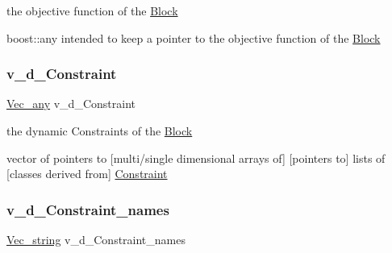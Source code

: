 the objective function of the \mbox{\hyperlink{class_s_m_spp__di__unipi__it_1_1_block}{Block}} 

boost\+::any intended to keep a pointer to the objective function of the \mbox{\hyperlink{class_s_m_spp__di__unipi__it_1_1_block}{Block}} \mbox{\label{class_s_m_spp__di__unipi__it_1_1_block_adbe2d40138adb5150da8553fdde5a88c}} 
\subsubsection{\texorpdfstring{v\+\_\+d\+\_\+\+Constraint}{v\_d\_Constraint}}
{\footnotesize\ttfamily \mbox{\hyperlink{group___s_m_s__types_ga58ded0963812566c064a5177b2f84c28}{Vec\+\_\+any}} v\+\_\+d\+\_\+\+Constraint\hspace{0.3cm}{\ttfamily [private]}}



the dynamic Constraints of the \mbox{\hyperlink{class_s_m_spp__di__unipi__it_1_1_block}{Block}} 

vector of pointers to \mbox{[}multi/single dimensional arrays of\mbox{]} \mbox{[}pointers to\mbox{]} lists of \mbox{[}classes derived from\mbox{]} \mbox{\hyperlink{class_s_m_spp__di__unipi__it_1_1_constraint}{Constraint}} \mbox{\label{class_s_m_spp__di__unipi__it_1_1_block_ad3efeb90252a4189e47182e80f0860ff}} 
\subsubsection{\texorpdfstring{v\+\_\+d\+\_\+\+Constraint\+\_\+names}{v\_d\_Constraint\_names}}
{\footnotesize\ttfamily \mbox{\hyperlink{group___s_m_s__types_ga36068d46bc6e7ba661efe0093c7a8beb}{Vec\+\_\+string}} v\+\_\+d\+\_\+\+Constraint\+\_\+names\hspace{0.3cm}{\ttfamily [protected]}}



